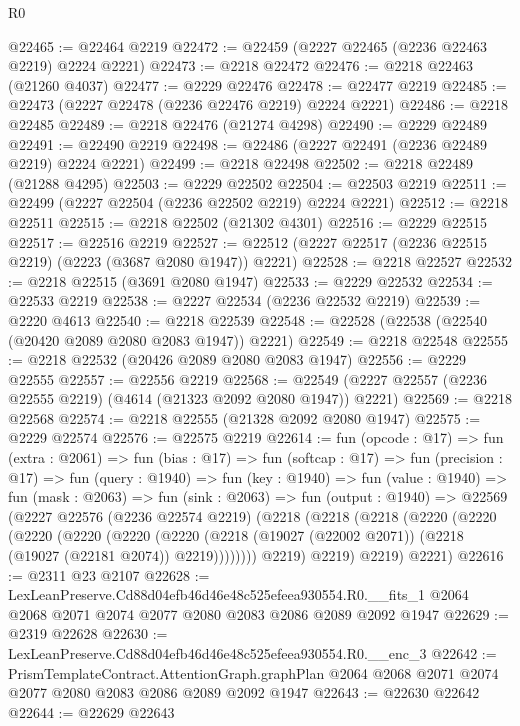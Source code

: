 \begin{lexlean}{R0}
\begin{coremodule}
@22465 := @22464 @2219
@22472 := @22459 (@2227 @22465 (@2236 @22463 @2219) @2224 @2221)
@22473 := @2218 @22472
@22476 := @2218 @22463 (@21260 @4037)
@22477 := @2229 @22476
@22478 := @22477 @2219
@22485 := @22473 (@2227 @22478 (@2236 @22476 @2219) @2224 @2221)
@22486 := @2218 @22485
@22489 := @2218 @22476 (@21274 @4298)
@22490 := @2229 @22489
@22491 := @22490 @2219
@22498 := @22486 (@2227 @22491 (@2236 @22489 @2219) @2224 @2221)
@22499 := @2218 @22498
@22502 := @2218 @22489 (@21288 @4295)
@22503 := @2229 @22502
@22504 := @22503 @2219
@22511 := @22499 (@2227 @22504 (@2236 @22502 @2219) @2224 @2221)
@22512 := @2218 @22511
@22515 := @2218 @22502 (@21302 @4301)
@22516 := @2229 @22515
@22517 := @22516 @2219
@22527 := @22512 (@2227 @22517 (@2236 @22515 @2219) (@2223 (@3687 @2080 @1947)) @2221)
@22528 := @2218 @22527
@22532 := @2218 @22515 (@3691 @2080 @1947)
@22533 := @2229 @22532
@22534 := @22533 @2219
@22538 := @2227 @22534 (@2236 @22532 @2219)
@22539 := @2220 @4613
@22540 := @2218 @22539
@22548 := @22528 (@22538 (@22540 (@20420 @2089 @2080 @2083 @1947)) @2221)
@22549 := @2218 @22548
@22555 := @2218 @22532 (@20426 @2089 @2080 @2083 @1947)
@22556 := @2229 @22555
@22557 := @22556 @2219
@22568 := @22549 (@2227 @22557 (@2236 @22555 @2219) (@4614 (@21323 @2092 @2080 @1947)) @2221)
@22569 := @2218 @22568
@22574 := @2218 @22555 (@21328 @2092 @2080 @1947)
@22575 := @2229 @22574
@22576 := @22575 @2219
@22614 := fun (opcode : @17) =>
  fun (extra : @2061) =>
  fun (bias : @17) =>
  fun (softcap : @17) =>
  fun (precision : @17) =>
  fun (query : @1940) =>
  fun (key : @1940) =>
  fun (value : @1940) =>
  fun (mask : @2063) =>
  fun (sink : @2063) =>
  fun (output : @1940) =>
  @22569
    (@2227
      @22576
      (@2236 @22574 @2219)
      (@2218
        (@2218
          (@2218
            (@2220
              (@2220
                (@2220
                  (@2220
                    (@2220
                      (@2220
                        (@2218 (@19027 (@22002 @2071)) (@2218 (@19027 (@22181 @2074)) @2219))))))))
            @2219)
          @2219)
        @2219)
      @2221)
@22616 := @2311 @23 @2107
@22628 := LexLeanPreserve.Cd88d04efb46d46e48c525efeea930554.R0.__fits_1
    @2064
    @2068
    @2071
    @2074
    @2077
    @2080
    @2083
    @2086
    @2089
    @2092
    @1947
@22629 := @2319 @22628
@22630 := LexLeanPreserve.Cd88d04efb46d46e48c525efeea930554.R0.__enc_3
@22642 := PrismTemplateContract.AttentionGraph.graphPlan
    @2064
    @2068
    @2071
    @2074
    @2077
    @2080
    @2083
    @2086
    @2089
    @2092
    @1947
@22643 := @22630 @22642
@22644 := @22629 @22643

\end{coremodule}
\end{lexlean}

